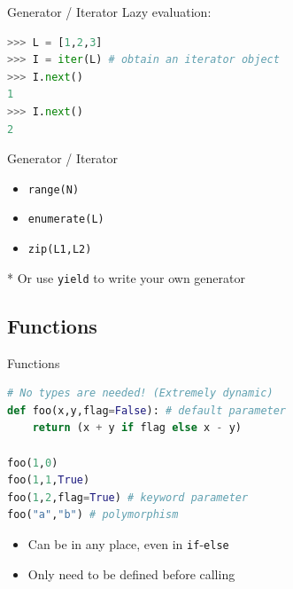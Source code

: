 \documentclass{../TexTemplate/myslide}
\begin{document}
\begin{frame}[fragile]{Generator / Iterator}
Lazy evaluation:
\begin{lstlisting}[language=python]
>>> L = [1,2,3]
>>> I = iter(L) # obtain an iterator object
>>> I.next()
1
>>> I.next()
2
\end{lstlisting}
\end{frame}

\begin{frame}[fragile]{Generator / Iterator}
\begin{itemize}
\item \verb'range(N)'
\item \verb'enumerate(L)'
\item \verb'zip(L1,L2)'
\end{itemize}
* Or use \verb'yield' to write your own generator
\end{frame}

\subsection{Functions}
\begin{frame}[fragile]{Functions}
\begin{lstlisting}[language=python]
# No types are needed! (Extremely dynamic)
def foo(x,y,flag=False): # default parameter
    return (x + y if flag else x - y)

foo(1,0)
foo(1,1,True)
foo(1,2,flag=True) # keyword parameter
foo("a","b") # polymorphism
\end{lstlisting}
\begin{itemize}
	\item Can be in any place, even in \verb'if'-\verb'else'
	\item Only need to be defined before calling
\end{itemize}
\end{frame}


\end{document}
